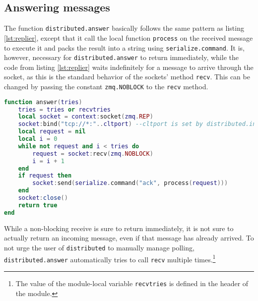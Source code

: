 \subsection{Answering messages}

The function \texttt{distributed.answer} basically follows the same pattern as listing \ref{lst:replier}, except that it call the local function \texttt{process} on the received message to execute it and packs the result into a string using \texttt{serialize.command}. It is, however, necessary for \texttt{distributed.answer} to return immediately, while the code from listing \ref{lst:replier} waits indefinitely for a message to arrive through the socket, as this is the standard behavior of the sockets' method \texttt{recv}. This can be changed by passing the constant \texttt{zmq.NOBLOCK} to the \texttt{recv} method.

\begin{lstlisting}[language=lua, caption={The function \texttt{answer} of the module \texttt{distributed}}, label=lst:distributedanswer, name=lst:distributedanswer]
function answer(tries)
	tries = tries or recvtries
	local socket = context:socket(zmq.REP)
	socket:bind("tcp://*:"..cltport) --cltport is set by distributed.init
	local request = nil
	local i = 0
	while not request and i < tries do
		request = socket:recv(zmq.NOBLOCK)
		i = i + 1
	end
	if request then
	    socket:send(serialize.command("ack", process(request)))
	end
	socket:close()
	return true
end
\end{lstlisting}

While a non-blocking receive is sure to return immediately, it is not sure to actually return an incoming message, even if that message has already arrived. To not urge the user of \texttt{distributed} to manually manage polling, \texttt{distributed.answer} automatically tries to call \texttt{recv} multiple times.\footnote{The value of the module-local variable \texttt{recvtries} is defined in the header of the module.}
